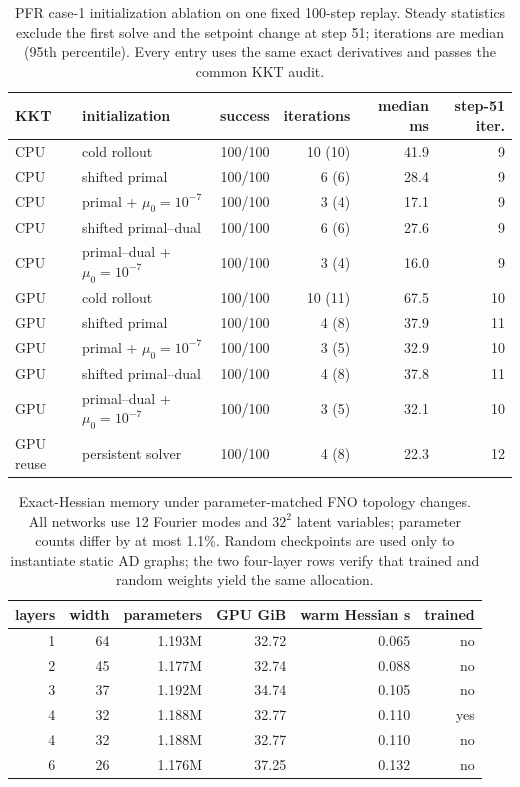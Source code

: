 \begin{table}[t]
\centering
\caption{PFR case-1 initialization ablation on one fixed 100-step replay. Steady statistics exclude the first solve and the setpoint change at step 51; iterations are median (95th percentile). Every entry uses the same exact derivatives and passes the common KKT audit.}
\label{tab:warm-start}
\small
\begin{tabular}{llrrrr}
\toprule
KKT & initialization & success & iterations & median ms & step-51 iter.\\
\midrule
CPU & cold rollout & 100/100 & 10 (10) & 41.9 & 9\\
CPU & shifted primal & 100/100 & 6 (6) & 28.4 & 9\\
CPU & primal + $\mu_0=10^{-7}$ & 100/100 & 3 (4) & 17.1 & 9\\
CPU & shifted primal--dual & 100/100 & 6 (6) & 27.6 & 9\\
CPU & primal--dual + $\mu_0=10^{-7}$ & 100/100 & 3 (4) & 16.0 & 9\\
GPU & cold rollout & 100/100 & 10 (11) & 67.5 & 10\\
GPU & shifted primal & 100/100 & 4 (8) & 37.9 & 11\\
GPU & primal + $\mu_0=10^{-7}$ & 100/100 & 3 (5) & 32.9 & 10\\
GPU & shifted primal--dual & 100/100 & 4 (8) & 37.8 & 11\\
GPU & primal--dual + $\mu_0=10^{-7}$ & 100/100 & 3 (5) & 32.1 & 10\\
GPU reuse & persistent solver & 100/100 & 4 (8) & 22.3 & 12\\
\bottomrule
\end{tabular}
\end{table}

\begin{table}[t]
\centering
\caption{Exact-Hessian memory under parameter-matched FNO topology changes. All networks use 12 Fourier modes and $32^2$ latent variables; parameter counts differ by at most 1.1\%. Random checkpoints are used only to instantiate static AD graphs; the two four-layer rows verify that trained and random weights yield the same allocation.}
\label{tab:topology-memory}
\small
\begin{tabular}{rrrrrr}
\toprule
layers & width & parameters & GPU GiB & warm Hessian s & trained\\
\midrule
1 & 64 & 1.193M & 32.72 & 0.065 & no\\
2 & 45 & 1.177M & 32.74 & 0.088 & no\\
3 & 37 & 1.192M & 34.74 & 0.105 & no\\
4 & 32 & 1.188M & 32.77 & 0.110 & yes\\
4 & 32 & 1.188M & 32.77 & 0.110 & no\\
6 & 26 & 1.176M & 37.25 & 0.132 & no\\
\bottomrule
\end{tabular}
\end{table}

